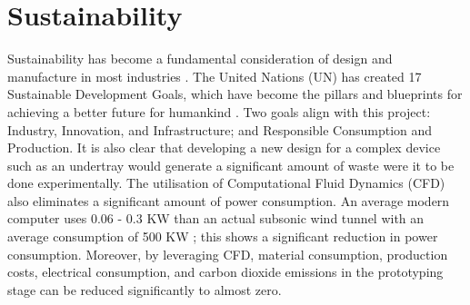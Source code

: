 \section{Sustainability}

\noindent Sustainability has become a fundamental consideration of design and manufacture in most industries \cite{Gates2021HowDisaster}. The United Nations (UN) has created 17 Sustainable Development Goals, which have become the pillars and blueprints for achieving a better future for humankind \cite{UNITEDNATIONS}. Two goals align with this project: Industry, Innovation, and Infrastructure; and Responsible Consumption and Production. It is also clear that developing a new design for a complex device such as an undertray would generate a significant amount of waste were it to be done experimentally. The utilisation of Computational Fluid Dynamics (CFD) also eliminates a significant amount of power consumption. An average modern computer uses 0.06 - 0.3  KW \cite{Anonymous2021HowEnerguide} than an actual subsonic wind tunnel with an average consumption of 500 KW \cite{Anonymous2021FAQGroup}; this shows a significant reduction in power consumption. Moreover, by leveraging CFD, material consumption, production costs, electrical consumption, and carbon dioxide emissions in the prototyping stage can be reduced significantly to almost zero. 


